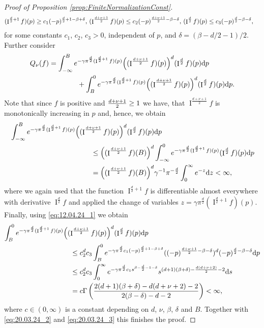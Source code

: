 \documentclass[11pt,a4paper]{article}
\theoremstyle{plain}
\theoremstyle{definition}
\theoremstyle{remark}
\newcommand{\dd}{{\rm d}}
\newcommand{\frI}{\mathop{\mathrm{I}}\nolimits}
\begin{document}
\begin{proof}[Proof of Proposition \ref{prop:FiniteNormalizationConst}]
\begin{equation}
\begin{aligned}
            &(\frI^{\frac{d}{2}+1}f)(p) \ge c_1(-p)^{{d\over 2}+1-\beta+\delta},\,  (\frI^{\frac{d+\nu+1}{2}}f)(p) \le c_2 (-p)^{{d+\nu+1\over 2}-\beta-\delta}, \, (\frI^{\frac{d}{2}}f)(p) \le c_3 (-p)^{{d\over 2}-\beta-\delta},
        \end{aligned}
    \end{equation}
    for some constants $c_1$, $c_2$, $c_3>0$, independent of $p$, and $\delta=(\beta-d/2-1)/2$. Further consider
    \begin{align}
        Q_{\nu}(f)&=\int_{-\infty}^{B}e^{-\gamma\pi^{\frac{d}{2}}(\frI^{\frac{d}{2}+1}f)(p)}\Big((\frI^{\frac{d+\nu+1}{2}}f)(p)\Big)^d (\frI^{\frac{d}{2}}f)(p)\dd p \notag\\
        &\qquad\qquad + \int_{B}^0 e^{-\gamma\pi^{\frac{d}{2}}(\frI^{\frac{d}{2}+1}f)(p)}\Big((\frI^{\frac{d+\nu+1}{2}}f)(p)\Big)^d (\frI^{\frac{d}{2}}f)(p)\dd p.\label{eq:20.03.24_2}
    \end{align}
    Note that since $f$ is positive and ${d+\nu+1\over 2}\ge 1$ we have, that $\frI^{\frac{d+\nu+1}{2}}f$ is monotonically increasing in $p$ and, hence, we obtain
    \begin{align}
        &\int_{-\infty}^B e^{-\gamma\pi^{\frac{d}{2}}(\frI^{\frac{d}{2}+1}f)(p)}\Big((\frI^{\frac{d+\nu+1}{2}}f)(p)\Big)^d (\frI^{\frac{d}{2}}f)(p) \dd p\notag\\
        &\hspace{4cm}\le \Big((\frI^{\frac{d+\nu+1}{2}}f)(B)\Big)^d\int_{-\infty}^0 e^{-\gamma\pi^{\frac{d}{2}}(\frI^{\frac{d}{2}+1}f)(p)} (\frI^{\frac{d}{2}}f)(p) \dd p\notag\\
        &\hspace{4cm}= \Big((\frI^{\frac{d+\nu+1}{2}}f)(B)\Big)^d\gamma^{-1}\pi^{-{d\over 2}} \int_{0}^\infty e^{-z} \dd z < \infty,\label{eq:20.03.24_3}
    \end{align}
    where we again used that the function $\frI^{\frac{d}{2}+1}f$ is differentiable almost everywhere with derivative $\frI^{\frac{d}{2}}f$ and applied the change of variables $z=\gamma\pi^{\frac{d}{2}}(\frI^{\frac{d}{2}+1}f)(p)$. Finally, using \eqref{eq:12.04.24_1} we obtain
    \begin{align*}
        \int_{B}^0 e^{-\gamma\pi^{\frac{d}{2}}(\frI^{\frac{d}{2}+1}f)(p)}&\Big((\frI^{\frac{d+\nu+1}{2}}f)(p)\Big)^d (\frI^{\frac{d}{2}}f)(p)\dd p \\
        &\quad\leq c_2^d c_3\int_{B}^{0} e^{-\gamma\pi^{d\over 2}c_1(-p)^{{d\over 2}+1-\beta+\delta}}((-p)^{\frac{d+\nu+1}{2}-\beta-\delta})^d(-p)^{\frac{d}{2}-\beta-\delta}\dd p\\
        &\quad\leq c_2^d c_3\int_{0}^{\infty} e^{-\gamma\pi^{d\over 2}c_1s^{\beta-{d\over 2}-1-\delta}}s^{(d+1)(\beta+\delta)-{d(d+\nu+2)\over 2}-2}\dd s\\
        &\quad=c \Gamma\left({2(d+1)(\beta+\delta)-d(d+\nu+2)-2\over 2(\beta-\delta)-d-2}\right)<\infty, 
    \end{align*}
    where $c\in(0,\infty)$ is a constant depending on $d$, $\nu$, $\beta$, $\delta$ and $B$. Together with \eqref{eq:20.03.24_2} and \eqref{eq:20.03.24_3}
    this finishes the proof.
    \end{proof}
\end{document}
